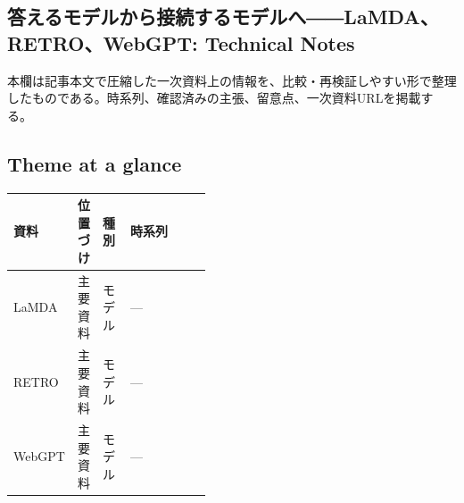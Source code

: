 \subsection*{答えるモデルから接続するモデルへ――LaMDA、RETRO、WebGPT: Technical Notes}
本欄は記事本文で圧縮した一次資料上の情報を、比較・再検証しやすい形で整理したものである。時系列、確認済みの主張、留意点、一次資料URLを掲載する。
\smallskip
{}\par
\medskip
\subsection*{Theme at a glance}
\begin{center}
\footnotesize
\begin{tabularx}{\linewidth}{@{}p{0.20\linewidth}p{0.10\linewidth}p{0.14\linewidth}X@{}}
\toprule
資料 & 位置づけ & 種別 & 時系列 \\
\midrule
LaMDA & 主要資料 & モデル & — \\
RETRO & 主要資料 & モデル & — \\
WebGPT & 主要資料 & モデル & — \\
\bottomrule
\end{tabularx}
\end{center}
\normalsize

